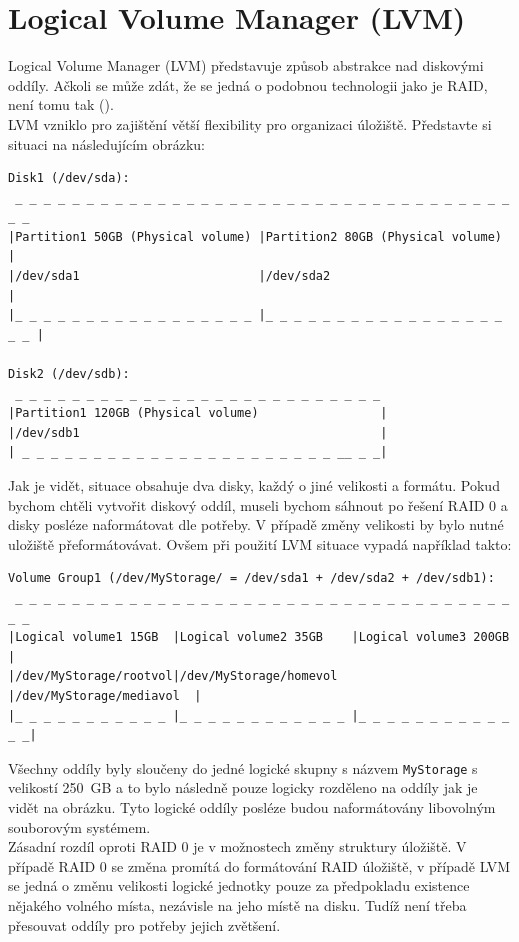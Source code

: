 \section{Logical Volume Manager (LVM)}
Logical Volume Manager (LVM) představuje způsob abstrakce nad diskovými oddíly. Ačkoli se může zdát, že se jedná o podobnou technologii jako je RAID, není tomu tak (\cite{arch-lvm}).\\
LVM vzniklo pro zajištění větší flexibility pro organizaci úložiště. Představte si situaci na následujícím obrázku:
\pagebreak
\begin{verbatim}
Disk1 (/dev/sda):
 _ _ _ _ _ _ _ _ _ _ _ _ _ _ _ _ _ _ _ _ _ _ _ _ _ _ _ _ _ _ _ _ _ _ _ _ _
|Partition1 50GB (Physical volume) |Partition2 80GB (Physical volume)     |
|/dev/sda1                         |/dev/sda2                             |
|_ _ _ _ _ _ _ _ _ _ _ _ _ _ _ _ _ |_ _ _ _ _ _ _ _ _ _ _ _ _ _ _ _ _ _ _ |
                                                     
Disk2 (/dev/sdb):
 _ _ _ _ _ _ _ _ _ _ _ _ _ _ _ _ _ _ _ _ _ _ _ _ _ _
|Partition1 120GB (Physical volume)                 |
|/dev/sdb1                                          |
| _ _ _ _ _ _ _ _ _ _ _ _ _ _ _ _ _ _ _ _ _ _ __ _ _|
\end{verbatim}
Jak je vidět, situace obsahuje dva disky, každý o jiné velikosti a formátu. Pokud bychom chtěli vytvořit diskový oddíl, museli bychom sáhnout po řešení RAID 0 a disky posléze naformátovat dle potřeby. V případě změny velikosti by bylo nutné uložiště přeformátovávat. Ovšem při použití LVM situace vypadá například takto:
\begin{verbatim}
Volume Group1 (/dev/MyStorage/ = /dev/sda1 + /dev/sda2 + /dev/sdb1):
 _ _ _ _ _ _ _ _ _ _ _ _ _ _ _ _ _ _ _ _ _ _ _ _ _ _ _ _ _ _ _ _ _ _ _ _ _ 
|Logical volume1 15GB  |Logical volume2 35GB    |Logical volume3 200GB    |
|/dev/MyStorage/rootvol|/dev/MyStorage/homevol  |/dev/MyStorage/mediavol  |
|_ _ _ _ _ _ _ _ _ _ _ |_ _ _ _ _ _ _ _ _ _ _ _ |_ _ _ _ _ _ _ _ _ _ _ _ _|
\end{verbatim}
Všechny oddíly byly sloučeny do jedné logické skupny s názvem \texttt{MyStorage} s velikostí 250~GB a to bylo následně pouze logicky rozděleno na oddíly jak je vidět na obrázku. Tyto logické oddíly posléze budou naformátovány libovolným souborovým systémem.\\
Zásadní rozdíl oproti RAID 0 je v možnostech změny struktury úložiště. V případě RAID 0 se změna promítá do formátování RAID úložiště, v případě LVM se jedná o změnu velikosti logické jednotky pouze za předpokladu existence nějakého volného místa, nezávisle na jeho místě na disku. Tudíž není třeba přesouvat oddíly pro potřeby jejich zvětšení.

